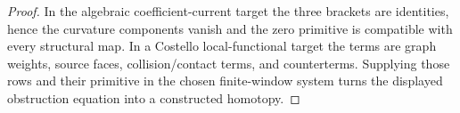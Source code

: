 \begin{proof}
  In the algebraic coefficient-current target the three brackets are
  identities, hence the curvature components vanish and the zero
  primitive is compatible with every structural map.  In a Costello
  local-functional target the terms are graph weights, source faces,
  collision/contact terms, and counterterms.  Supplying those rows and
  their primitive in the chosen finite-window system turns the displayed
  obstruction equation into a constructed homotopy.
\end{proof}
